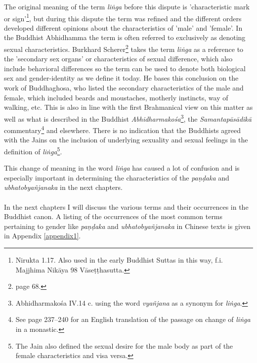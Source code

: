 The original meaning of the term {\em liṅga} before this dispute is 'characteristic mark or sign'\footnote{Nirukta 1.17. Also used in the early Buddhist Suttas in this way, f.i. Majjhima Nikāya 98 Vāseṭṭhasutta.}, but during this dispute the term was refined and the different orders developed different opinions about the characteristics of 'male' and 'female'. In the Buddhist Abhidhamma the term is often referred to exclusively as denoting sexual characteristics. Burkhard Scherer\footnote{\cite{scherer} page 68.} takes the term {\em liṅga} as a reference to the 'secondary sex organs' or characteristics of sexual difference, which also include behavioral differences so the term can be used to denote both biological sex and gender-identity as we define it today. He bases this conclusion on the work of Buddhaghosa, who listed the secondary characteristics of the male and female, which included beards and moustaches, motherly instincts, way of walking, etc. This is also in line with the first Brahmanical view on this matter as well as what is described in the Buddhist {\em Abhidharmakośa}\footnote{Abhidharmakośa IV.14 c. using the word {\em vyañjana} as a synonym for {\em liṅga}.}, the {\em Samantapāsādikā} commentary\footnote{See \cite{anderson2016} page 237–240 for an English translation of the passage on change of {\em liṅga} in a monastic.} and elsewhere. There is no indication that the Buddhists agreed with the Jains on the inclusion of underlying sexuality and sexual feelings in the definition of {\em liṅga}\footnote{The Jain also defined the sexual desire for the male body as part of the female characteristics and visa versa.}.

This change of meaning in the word {\em liṅga} has caused a lot of confusion and is especially important in determining the characteristics of the {\em paṇḍaka} and {\em ubhatob­yañ­janaka} in the next chapters.\\
\\
In the next chapters I will discuss the various terms and their occurrences in the Buddhist canon. A listing of the occurrences of the most common terms pertaining to gender like {\em paṇḍaka} and {\em ubhatob­yañ­janaka} in Chinese texts is given in Appendix \ref{appendix1}. 
